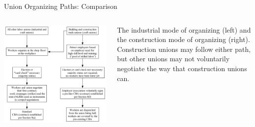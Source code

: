 \documentclass{beamer}
\begin{document}
\begin{frame}{Union Organizing Paths: Comparison}
  \begin{columns}
    \includegraphics[scale=0.148]{../images/organizing_paths}

    The industrial mode of organizing (left) and the construction mode of organizing (right).\newline\newline
    Construction unions may follow either path, but other unions may not voluntarily negotiate the way that construction unions can.
    \end{columns}
\end{frame}

%
\end{document}
